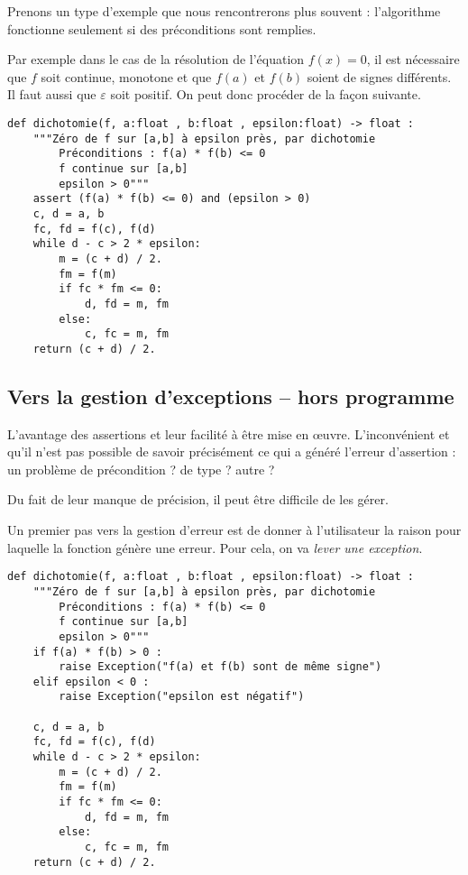 \begin{exemple} Prenons un type d'exemple que nous rencontrerons plus souvent : l'algorithme fonctionne seulement si des préconditions sont remplies. 

Par exemple dans le cas de la résolution de l'équation $f(x)=0$, il est nécessaire que $f$ soit continue, monotone et que $f(a)$ et $f(b)$ soient de signes différents. Il faut aussi que $\varepsilon$ soit positif. On peut donc procéder de la façon suivante. 

\begin{lstlisting}
def dichotomie(f, a:float , b:float , epsilon:float) -> float :
    """Zéro de f sur [a,b] à epsilon près, par dichotomie
        Préconditions : f(a) * f(b) <= 0
        f continue sur [a,b]
        epsilon > 0"""
    assert (f(a) * f(b) <= 0) and (epsilon > 0)
    c, d = a, b
    fc, fd = f(c), f(d)
    while d - c > 2 * epsilon:
        m = (c + d) / 2.
        fm = f(m)
        if fc * fm <= 0:
            d, fd = m, fm
        else:
            c, fc = m, fm
    return (c + d) / 2.
\end{lstlisting}
\end{exemple}

\subsection{Vers la gestion d'exceptions -- hors programme}
L'avantage des assertions et leur facilité à être mise en \oe{}uvre. L'inconvénient et qu'il n'est pas possible de savoir précisément ce qui a généré l'erreur d'assertion : un problème de précondition ? de type ? autre ?

Du fait de leur manque de précision, il peut être difficile de les gérer. 

Un premier pas vers la gestion d'erreur est de donner à l'utilisateur la raison pour laquelle la fonction génère une erreur. 
Pour cela, on va \textit{lever une exception}.

\begin{lstlisting}
def dichotomie(f, a:float , b:float , epsilon:float) -> float :
    """Zéro de f sur [a,b] à epsilon près, par dichotomie
        Préconditions : f(a) * f(b) <= 0
        f continue sur [a,b]
        epsilon > 0"""
    if f(a) * f(b) > 0 : 
        raise Exception("f(a) et f(b) sont de même signe")
    elif epsilon < 0 :
        raise Exception("epsilon est négatif")

    c, d = a, b
    fc, fd = f(c), f(d)
    while d - c > 2 * epsilon:
        m = (c + d) / 2.
        fm = f(m)
        if fc * fm <= 0:
            d, fd = m, fm
        else:
            c, fc = m, fm
    return (c + d) / 2.
\end{lstlisting}

